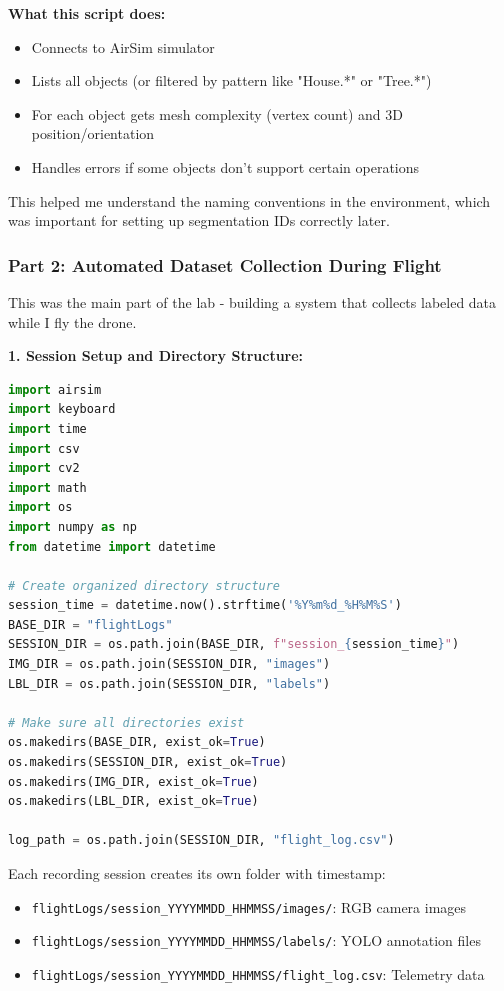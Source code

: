 \textbf{What this script does:}
\begin{itemize}
	\item Connects to AirSim simulator
	\item Lists all objects (or filtered by pattern like "House.*" or "Tree.*")
	\item For each object gets mesh complexity (vertex count) and 3D position/orientation
	\item Handles errors if some objects don't support certain operations
\end{itemize}

This helped me understand the naming conventions in the environment, which was important for setting up segmentation IDs correctly later.

\clearpage

\subsubsection{Part 2: Automated Dataset Collection During Flight}

This was the main part of the lab - building a system that collects labeled data while I fly the drone.

\textbf{1. Session Setup and Directory Structure:}
\begin{lstlisting}[language=Python]
import airsim
import keyboard
import time 
import csv
import cv2
import math 
import os
import numpy as np
from datetime import datetime

# Create organized directory structure
session_time = datetime.now().strftime('%Y%m%d_%H%M%S')
BASE_DIR = "flightLogs"
SESSION_DIR = os.path.join(BASE_DIR, f"session_{session_time}")
IMG_DIR = os.path.join(SESSION_DIR, "images")
LBL_DIR = os.path.join(SESSION_DIR, "labels")

# Make sure all directories exist
os.makedirs(BASE_DIR, exist_ok=True)
os.makedirs(SESSION_DIR, exist_ok=True)
os.makedirs(IMG_DIR, exist_ok=True)
os.makedirs(LBL_DIR, exist_ok=True)

log_path = os.path.join(SESSION_DIR, "flight_log.csv")
\end{lstlisting}

Each recording session creates its own folder with timestamp:
\begin{itemize}
	\item \texttt{flightLogs/session\_YYYYMMDD\_HHMMSS/images/}: RGB camera images
	\item \texttt{flightLogs/session\_YYYYMMDD\_HHMMSS/labels/}: YOLO annotation files
	\item \texttt{flightLogs/session\_YYYYMMDD\_HHMMSS/flight\_log.csv}: Telemetry data
\end{itemize}

